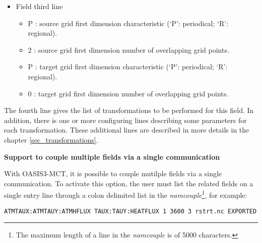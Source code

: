 \begin{itemize}
\begin{itemize}
    These source and target grid dimensions are optional but note that
    in order to have 2D fields written as 2D arrays in the debug
    files, these dimensions must be provided in the {\it namcouple};
    otherwise, the fields will be written out as 1D arrays.
  
  \item toce : prefix of the source grid name in grid data files (see
    section \ref{subsec_griddata}) (80 characters maximum)
  \item atmo : prefix of the target grid name in grid data files (80 characters maximum) 
  \item {\tt LAG=+14400}: optional lag index for the field (see section \ref{subsub_lag})
  \item {\tt SEQ=+1}: optional sequence index for the field (see
    section \ref{subsec_sec})
  \end{itemize}
\item Field third line
  \begin{itemize}
  \item P : source grid first dimension characteristic (`P':
    periodical; `R': regional).
  \item 2 : source grid first dimension number of overlapping grid
    points.
  \item P : target grid first dimension characteristic (`P':
    periodical; `R': regional).
  \item 0 : target grid first dimension number of overlapping grid
    points.
  \end{itemize}
     
\end{itemize}
    
The fourth line gives the list of transformations to be performed for
this field. In addition, there is one or more configuring lines
describing some parameters for each transformation. These additional
lines are described in more details in the chapter
\ref{sec_transformations}.

{\bf Support to couple multiple fields via a single communication}

With OASIS3-MCT, it is possible to couple mutilple fields via a
single communication. To activate this option, the user must list the
related fields on a single entry line through a colon
delimited list in the {\it namcouple}\footnote{The maximum length of a line in the
{\it namcouple} is of 5000 characters.}, for example:

{\tt ATMTAUX:ATMTAUY:ATMHFLUX  TAUX:TAUY:HEATFLUX 1 3600 3 rstrt.nc EXPORTED}

